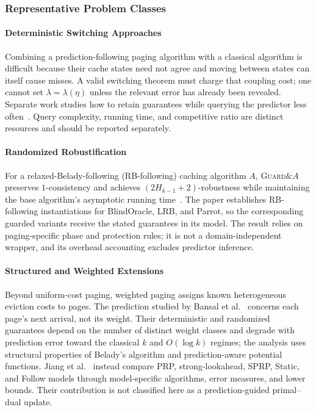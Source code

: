 \documentclass[acmsmall,screen,nonacm]{acmart}
\theoremstyle{acmdefinition}%
\begin{document}
\subsubsection{Representative Problem Classes}

\paragraph{Deterministic Switching Approaches}
Combining a prediction-following paging algorithm with a classical algorithm is difficult because their cache states need not agree and moving between states can itself cause misses. A valid switching theorem must charge that coupling cost; one cannot set $\lambda=\lambda(\eta)$ unless the relevant error has already been revealed. Separate work studies how to retain guarantees while querying the predictor less often~\cite{im2022parsimonious,sadek2024reduced}. Query complexity, running time, and competitive ratio are distinct resources and should be reported separately.

\paragraph{Randomized Robustification}
For a relaxed-Belady-following (RB-following) caching algorithm $A$, \textsc{Guard}$\&A$ preserves $1$-consistency and achieves $(2H_{k-1}+2)$-robustness while maintaining the base algorithm's asymptotic running time~\cite{chen2025robustifying}. The paper establishes RB-following instantiations for BlindOracle, LRB, and Parrot, so the corresponding guarded variants receive the stated guarantees in its model. The result relies on paging-specific phase and protection rules; it is not a domain-independent wrapper, and its overhead accounting excludes predictor inference.

\paragraph{Structured and Weighted Extensions}
Beyond uniform-cost paging, weighted paging assigns known heterogeneous eviction costs to pages. The prediction studied by Bansal et al.~\cite{bansal2022weighted} concerns each page's next arrival, not its weight. Their deterministic and randomized guarantees depend on the number of distinct weight classes and degrade with prediction error toward the classical $k$ and $O(\log k)$ regimes; the analysis uses structural properties of Belady's algorithm and prediction-aware potential functions. Jiang et al.~\cite{jiang2020weighted} instead compare PRP, strong-lookahead, SPRP, Static, and Follow models through model-specific algorithms, error measures, and lower bounds. Their contribution is not classified here as a prediction-guided primal--dual update.
\end{document}
